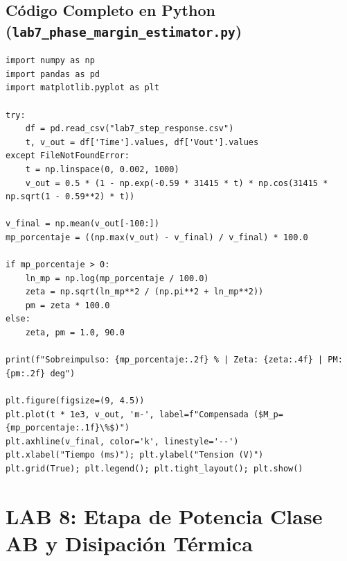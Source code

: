 \documentclass[10pt,a4paper,twoside]{article}
\begin{document}
\subsection{Código Completo en Python (\texttt{lab7\_phase\_margin\_estimator.py})}
\begin{lstlisting}
import numpy as np
import pandas as pd
import matplotlib.pyplot as plt

try:
    df = pd.read_csv("lab7_step_response.csv")
    t, v_out = df['Time'].values, df['Vout'].values
except FileNotFoundError:
    t = np.linspace(0, 0.002, 1000)
    v_out = 0.5 * (1 - np.exp(-0.59 * 31415 * t) * np.cos(31415 * np.sqrt(1 - 0.59**2) * t))

v_final = np.mean(v_out[-100:])
mp_porcentaje = ((np.max(v_out) - v_final) / v_final) * 100.0

if mp_porcentaje > 0:
    ln_mp = np.log(mp_porcentaje / 100.0)
    zeta = np.sqrt(ln_mp**2 / (np.pi**2 + ln_mp**2))
    pm = zeta * 100.0
else:
    zeta, pm = 1.0, 90.0

print(f"Sobreimpulso: {mp_porcentaje:.2f} % | Zeta: {zeta:.4f} | PM: {pm:.2f} deg")

plt.figure(figsize=(9, 4.5))
plt.plot(t * 1e3, v_out, 'm-', label=f"Compensada ($M_p={mp_porcentaje:.1f}\%$)")
plt.axhline(v_final, color='k', linestyle='--')
plt.xlabel("Tiempo (ms)"); plt.ylabel("Tension (V)")
plt.grid(True); plt.legend(); plt.tight_layout(); plt.show()
\end{lstlisting}

\newpage
\section{LAB 8: Etapa de Potencia Clase AB y Disipación Térmica}
\end{document}
